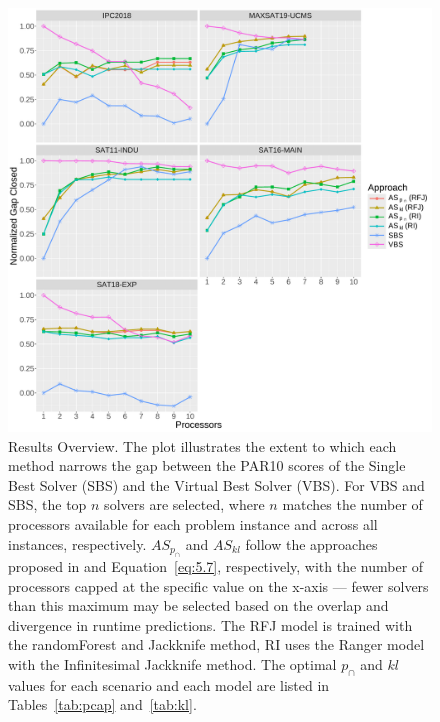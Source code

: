 \begin{figure}
        \includegraphics[width=\linewidth]{plots/kl_pcap_comparison_line_chart_parallel_NormalizedGap.pdf}    
    \caption[Results Summary: Comparing $AS_{p_{\cap}}$ with $AS_{kl}$ Performance]{
    Results Overview. The plot illustrates the extent to which each method narrows the gap between the PAR10 scores of the Single Best Solver (SBS) and the Virtual Best Solver (VBS). For VBS and SBS, the top $n$ solvers are selected, where $n$ matches the number of processors available for each problem instance and across all instances, respectively. $AS_{p_{\cap}}$ and $AS_{kl}$ follow the approaches proposed in \cite{kashgarani2023automatic} and Equation~\ref{eq:5.7}, respectively, with the number of processors capped at the specific value on the x-axis — fewer solvers than this maximum may be selected based on the overlap and divergence in runtime predictions. The RFJ model is trained with the randomForest and Jackknife method, RI uses the Ranger model with the Infinitesimal Jackknife method. The optimal $p_{\cap}$ and $kl$ values for each scenario and each model are listed in Tables~\ref{tab:pcap} and~\ref{tab:kl}.
    }
    \label{fig:klvspcap}
\end{figure}

